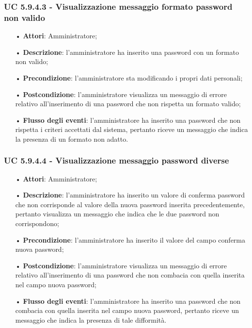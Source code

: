 \subsubsection{UC 5.9.4.3 - Visualizzazione messaggio formato password non valido}
\begin{itemize}
	\item[•]\textbf{Attori}: Amministratore;
	\item[•]\textbf{Descrizione}: l'amministratore ha inserito una password con un formato non valido;
	\item[•]\textbf{Precondizione}: l'amministratore sta modificando i propri dati personali;
	\item[•]\textbf{Postcondizione}: l'amministratore visualizza un messaggio di errore relativo all'inserimento di una password che non rispetta un formato valido; 
	\item[•]\textbf{Flusso degli eventi}: l'amministratore ha inserito una password che non rispetta i criteri accettati dal sistema, pertanto riceve un messaggio che indica la presenza di un formato non adatto.
\end{itemize}

\subsubsection{UC 5.9.4.4 - Visualizzazione messaggio password diverse}
\begin{itemize}
	\item[•]\textbf{Attori}: Amministratore;
	\item[•]\textbf{Descrizione}: l'amministratore ha inserito un valore di conferma password che non corrisponde al valore della nuova password inserita precedentemente, pertanto visualizza un messaggio che indica che le due password non corrispondono;
	\item[•]\textbf{Precondizione}: l'amministratore ha inserito il valore del campo conferma nuova password;
	\item[•]\textbf{Postcondizione}: l'amministratore visualizza un messaggio di errore relativo all'inserimento di una password che non combacia con quella inserita nel campo nuova password; 
	\item[•]\textbf{Flusso degli eventi}: l'amministratore ha inserito una password che non combacia con quella inserita nel campo nuova password, pertanto riceve un messaggio che indica la presenza di tale difformità.
\end{itemize}

